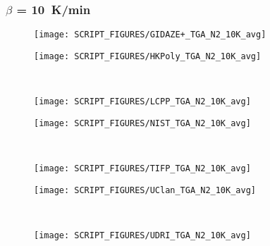 \subsubsection{$\beta$ = 10~K/min}
\begin{minipage}{0.5\textwidth}
\begin{figure}[H]
{\texttt{[image: SCRIPT\_FIGURES/GIDAZE+\_TGA\_N2\_10K\_avg]}}\\
\end{figure}
\end{minipage} 
\begin{minipage}{0.35\textwidth}
\begin{figure}[H]
{\texttt{[image: SCRIPT\_FIGURES/HKPoly\_TGA\_N2\_10K\_avg]}}\\
\end{figure}
\end{minipage}\\
\begin{minipage}{0.5\textwidth}
\begin{figure}[H]
{\texttt{[image: SCRIPT\_FIGURES/LCPP\_TGA\_N2\_10K\_avg]}}\\
\end{figure}
\end{minipage} 
\begin{minipage}{0.35\textwidth}
\begin{figure}[H]
{\texttt{[image: SCRIPT\_FIGURES/NIST\_TGA\_N2\_10K\_avg]}}\\
\end{figure}
\end{minipage}\\
\begin{minipage}{0.5\textwidth}
\begin{figure}[H]
{\texttt{[image: SCRIPT\_FIGURES/TIFP\_TGA\_N2\_10K\_avg]}}\\
\end{figure}
\end{minipage} 
\begin{minipage}{0.35\textwidth}
\begin{figure}[H]
{\texttt{[image: SCRIPT\_FIGURES/UClan\_TGA\_N2\_10K\_avg]}}\\
\end{figure}
\end{minipage}\\
\begin{minipage}{0.5\textwidth}
\begin{figure}[H]
{\texttt{[image: SCRIPT\_FIGURES/UDRI\_TGA\_N2\_10K\_avg]}}\\
\end{figure}
\end{minipage} 
